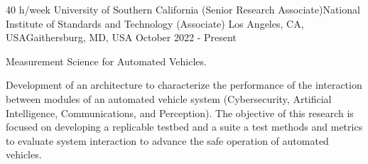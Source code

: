


\begin{cventries}



\cventry
{40 h/week} %
{University of Southern California (Senior Research Associate)\newline National Institute of Standards and Technology (Associate)} %
{Los Angeles, CA, USA\newline Gaithersburg, MD, USA} %
{October 2022 - Present} %
{ %
\begin{cvitems}
\item {Measurement Science for Automated Vehicles.}
    \begin{cvitems2}
    \item {Development of an architecture to characterize the performance of the interaction between modules of an automated vehicle system (Cybersecurity, Artificial Intelligence, Communications, and Perception). The objective of this research is focused on developing a replicable testbed and a suite a test methods and metrics to evaluate system interaction to advance the safe operation of automated vehicles.}
    \end{cvitems2}
\end{cvitems}
}



\end{cventries}
